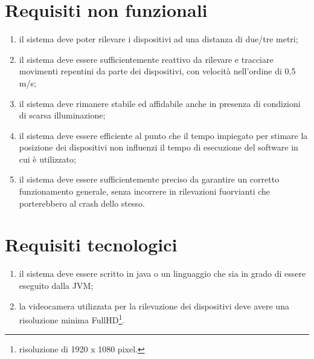 \documentclass[12pt,a4paper,openright,twoside]{book}
\begin{document}
\section{Requisiti non funzionali} \label{sec:requisiti_non_funzionali}
\begin{enumerate}[label=RNF\arabic*]
	\item il sistema deve poter rilevare i dispositivi ad una distanza di due/tre metri;
	\item il sistema deve essere sufficientemente reattivo da rilevare e tracciare movimenti repentini da parte dei dispositivi, con velocità nell'ordine di 0,5 m/s;
	\item il sistema deve rimanere stabile ed affidabile anche in presenza di condizioni di scarsa illuminazione;
	\item il sistema deve essere efficiente al punto che il tempo impiegato per stimare la posizione dei dispositivi non influenzi il tempo di esecuzione del software in cui è utilizzato;
	\item il sistema deve essere sufficientemente preciso da garantire un corretto funzionamento generale, senza incorrere in rilevazioni fuorvianti che porterebbero al crash dello stesso.
\end{enumerate}
\section{Requisiti tecnologici}
\begin{enumerate}[label=RT\arabic*]
	\item il sistema deve essere scritto in java o un linguaggio che sia in grado di essere eseguito dalla JVM;
	\item la videocamera utilizzata per la rilevazione dei dispositivi deve avere una risoluzione minima FullHD\footnote{risoluzione di 1920 x 1080 pixel.}.
\end{enumerate}
\end{document}
